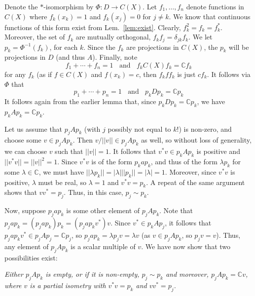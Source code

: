 \documentclass[aps,pra,showpacs,notitlepage,onecolumn,superscriptaddress,nofootinbib]{revtex4-1}
\theoremstyle{definition}
\newcommand{\hhrulefill}{\hspace{-1.5em} \hrulefill}
\begin{document}
Denote the $*$-isomorphism by $\Phi : D \rightarrow C(X)$. Let $f_1, \dots, f_n$ denote functions in $C(X)$ where $f_k(x_k) = 1$ and $f_k(x_j) = 0$
for $j \neq k$. We know that continuous functions of this form exist from Lem.~\ref{lem:exist}. Clearly, $f_k^2 = f_k = f_k^{*}$. Moreover,
the set of $f_k$ are mutually orthogonal, $f_k f_j = \delta_{jk} f_k$. We let $p_k = \Phi^{-1}(f_k)$, for each $k$. Since the $f_k$ are projections
in $C(X)$, the $p_k$ will be projections in $D$ (and thus $A$). Finally, note
\begin{equation}
  f_1 + \cdots + f_n = 1 \ \ \ \ \text{and} \ \ \ \ f_k C(X) f_k = \mathbb{C} f_k
\end{equation}
for any $f_k$ (as if $f \in C(X)$ and $f(x_k) = c$, then $f_k f f_k$ is just $c f_k$. It follows via $\Phi$ that
\begin{equation}
  p_1 + \cdots + p_n = 1 \ \ \ \ \text{and} \ \ \ \ p_k D p_k = \mathbb{C} p_k
\end{equation}
It follows again from the earlier lemma that, since $p_k D p_k = \mathbb{C} p_k$, we have $p_k A p_k = \mathbb{C} p_k$.

Let us assume that $p_j A p_k$ (with $j$ possibly not equal to $k$!) is non-zero, and choose some $v \in p_j A p_k$. Then $v/||v|| \in p_j A p_k$ as well, so without loss
of generality, we can choose $v$ such that $||v|| = 1$. It follows that $v^{*} v \in p_k A p_k$ is positive and $||v^{*} v|| = ||v||^2 = 1$.
Since $v^{*} v$ is of the form $p_k a p_k$, and thus of the form $\lambda p_k$ for some $\lambda \in \mathbb{C}$, we must have $||\lambda p_k|| = |\lambda| ||p_k|| = |\lambda| = 1$.
Moreover, since $v^{*} v$ is positive, $\lambda$ must be real, so $\lambda = 1$ and $v^{*} v = p_k$. A repeat of the same argument shows that $v v^{*} = p_j$. Thus,
in this case, $p_j \sim p_k$.

Now, suppose $p_j a p_k$ is some other element of $p_j A p_k$. Note that $p_j a p_k = (p_j a p_k) p_k = (p_j a p_k v^{*}) v$. Since $v^{*} \in p_k A p_j$,
it follows that $p_j a p_k v^{*} \in p_j A p_j = \mathbb{C} p_j$, so $p_j a p_k = \lambda p_j v = \lambda v$ (as $v \in p_j A p_k$, so $p_j v = v$). Thus,
any element of $p_j A p_k$ is a scalar multiple of $v$. We have now show that two possibilities exist:

\hhrulefill

\noindent \emph{Either $p_j A p_k$ is empty, or if it is non-empty, $p_j \sim p_k$ and moreover, $p_j A p_k = \mathbb{C} v$, where
$v$ is a partial isometry with $v^{*} v = p_k$ and $v v^{*} = p_j$.}
\end{document}
